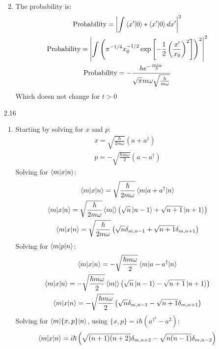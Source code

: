\documentclass[10pt]{article}
\begin{document}
\begin{enumerate}
\begin{enumerate}
\begin{gather*}
      \end{gather*}
      \item The probability is:
      \begin{gather*}
        \text{Probability}=\left| \int\braket{x'|0}*\braket{x'|0}dx' \right|^2\\
        \text{Probability}=\left| \int\left( \pi^{-1/4}x_0^{-1/2}\exp\left[ -\frac{1}{2}\left( \frac{x'}{x_0} \right)^2 \right]\right)^2\right|^2\\
        \text{Probability}=-\frac{h e^{-\frac{m x \omega }{h}}}{\sqrt{\pi } m \omega  \sqrt{\frac{h}{m \omega }}}
      \end{gather*}
      Which doesn not change for $t>0$
    \end{enumerate}
    \item[2.16]
    \begin{enumerate}
      \item Starting by solving for $x$ and $p$:
      \begin{gather*}
        x=\sqrt{\frac{\hbar}{2m\omega}}(a+a^{\dagger})\\
        p=-\sqrt{\frac{\hbar m\omega}{2}}(a-a^{\dagger})
      \end{gather*}
      Solving for $\braket{m|x|n}$:
      \begin{gather*}
        \braket{m|x|n}=\sqrt{\frac{\hbar}{2m\omega}}\braket{m|a+a^{\dagger}|n}\\
        \braket{m|x|n}=\sqrt{\frac{\hbar}{2m\omega}}\braket{m|}\left(\sqrt{n}\ket{n-1}+\sqrt{n+1}\ket{n+1}  \right)\\
        \braket{m|x|n}=\sqrt{\frac{\hbar}{2m\omega}}\left( \sqrt{n}\delta_{m,n-1}+\sqrt{n+1}\delta_{m,n+1}\right)
      \end{gather*}
      Solving for $\braket{m|p|n}$:
      \begin{gather*}
        \braket{m|x|n}=-\sqrt{\frac{\hbar m\omega}{2}}\braket{m|a-a^{\dagger}|n}\\
        \braket{m|x|n}=-\sqrt{\frac{\hbar m\omega}{2}}\braket{m|}\left(\sqrt{n}\ket{n-1}-\sqrt{n+1}\ket{n+1}  \right)\\
        \braket{m|x|n}=-\sqrt{\frac{\hbar m\omega}{2}}\left( \sqrt{n}\delta_{m,n-1}-\sqrt{n+1}\delta_{m,n+1}\right)
      \end{gather*}
      Solving for $\braket{m|\{x,p\}|n}$, using $\{x,p\}=i\hbar(a^{\dagger}^2-a^2)$:
      \begin{gather*}
        \braket{m|x|n}=i\hbar\left(\sqrt{(n+1)(n+2)}\delta_{m,n+2}-\sqrt{n(n-1)}\delta_{m,n-2}\right)

\end{gather*}
\end{enumerate}
\end{enumerate}
\end{document}
